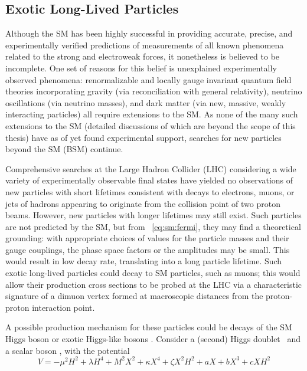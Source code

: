 \subsection{Exotic Long-Lived Particles}
\label{sec:sm:llp}
Although the SM has been highly successful in providing accurate, precise, and experimentally verified predictions of measurements of all known phenomena related to the strong and electroweak forces, it nonetheless is believed to be incomplete.
One set of reasons for this belief is unexplained experimentally observed phenomena: renormalizable and locally gauge invariant quantum field theories incorporating gravity (via reconciliation with general relativity), neutrino oscillations (via neutrino masses), and dark matter (via new, massive, weakly interacting particles) all require extensions to the SM.
As none of the many such extensions to the SM (detailed discussions of which are beyond the scope of this thesis) have as of yet found experimental support, searches for new particles beyond the SM (BSM) continue.

Comprehensive searches at the Large Hadron Collider (LHC) considering a wide variety of experimentally observable final states have yielded no observations of new particles with short lifetimes consistent with decays to electrons, muons, or jets of hadrons appearing to originate from the collision point of two proton beams.
However, new particles with longer lifetimes may still exist.
Such particles are not predicted by the SM, but from \Eq~\ref{eq:sm:fermi}, they may find a theoretical grounding: with appropriate choices of values for the particle masses and their gauge couplings, the phase space factors or the amplitudes may be small.
This would result in low decay rate, translating into a long particle lifetime.
Such exotic long-lived particles could decay to SM particles, such as muons; this would allow their production cross sections to be probed at the LHC via a characteristic signature of a dimuon vertex formed at macroscopic distances from the proton-proton interaction point.

A possible production mechanism for these particles could be decays of the SM Higgs boson or exotic Higgs-like bosons \cite{STRASSLER2008263}.
Consider a (second) Higgs doublet \PHiggs\ and a scalar boson \PLLP, with the potential
\begin{equation}
  V = -\mu^2 H^2 + \lambda H^4 + M^2 X^2 + \kappa X^4 + \zeta X^2 H^2 + a X + b X^3 + c X H^2
  \label{eq:sm:extrapotential}
\end{equation}

